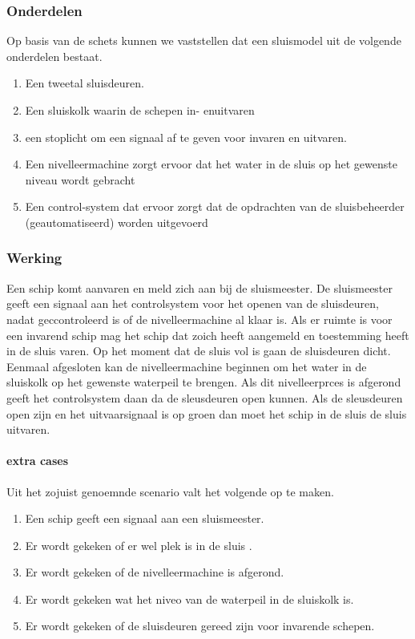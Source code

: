 \subsubsection{Onderdelen}
Op basis van de schets kunnen we vaststellen dat een sluismodel uit de volgende onderdelen bestaat.

\begin{enumerate}
	\item Een tweetal sluisdeuren. 
	\item Een sluiskolk waarin de schepen in- enuitvaren
	\item een stoplicht om een signaal af te geven voor invaren en uitvaren.
	\item Een nivelleermachine zorgt ervoor dat het water in de sluis op het gewenste niveau wordt gebracht
	\item Een control-system dat ervoor zorgt dat de opdrachten van de sluisbeheerder (geautomatiseerd) worden uitgevoerd
\end{enumerate}
\subsubsection{Werking}

Een schip komt aanvaren en meld zich aan bij de sluismeester. De sluismeester geeft een signaal aan het controlsystem voor het openen van de sluisdeuren, nadat geccontroleerd is of de nivelleermachine al klaar is. Als er ruimte is voor een invarend schip mag het schip dat zoich heeft aangemeld en toestemming heeft  in de sluis varen. Op het moment dat de sluis vol is gaan de sluisdeuren dicht. Eenmaal afgesloten kan de nivelleermachine beginnen om het water in de sluiskolk op het gewenste waterpeil te brengen. Als dit nivelleerprces is afgerond geeft  het controlsystem daan da de sleusdeuren open kunnen.  Als de sleusdeuren open zijn en het uitvaarsignaal is op groen dan moet het schip in de sluis de sluis uitvaren.
\paragraph{extra cases}
Uit het zojuist genoemnde scenario valt het volgende op te maken.
\begin{enumerate}
	\item Een schip geeft een signaal aan een sluismeester.
	\item Er wordt gekeken of er wel plek is in de sluis .
	\item Er wordt gekeken of de nivelleermachine is afgerond.
	\item Er wordt gekeken wat het niveo van de waterpeil in de sluiskolk is.
	\item Er wordt gekeken of de sluisdeuren gereed zijn voor invarende schepen.
\end{enumerate}

